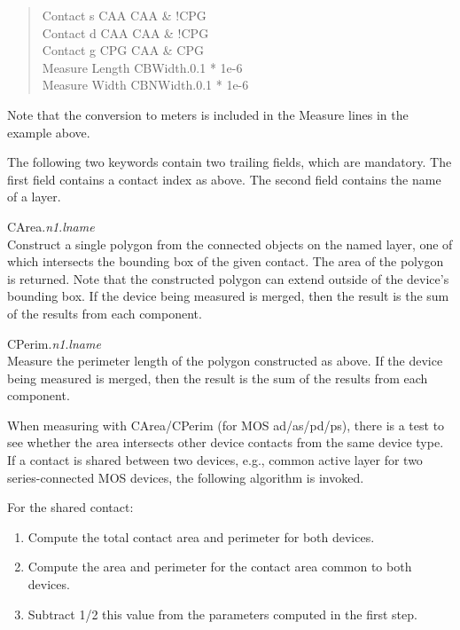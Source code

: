 \begin{description}
\begin{description}
\begin{quote}\rr\vt
Contact s CAA CAA \& !CPG\\
Contact d CAA CAA \& !CPG\\
Contact g CPG CAA \& CPG\\
Measure Length CBWidth.0.1 * 1e-6\\
Measure Width CBNWidth.0.1 * 1e-6\\
\end{quote}

Note that the conversion to meters is included in the {\et Measure}
lines in the example above.

The following two keywords contain two trailing fields, which are
mandatory.  The first field contains a contact index as above.  The
second field contains the name of a layer.

\begin{description}
\item{\et CArea}.{\it n1}.{\it lname}\\
Construct a single polygon from the connected objects on the named
layer, one of which intersects the bounding box of the given contact. 
The area of the polygon is returned.  Note that the constructed
polygon can extend outside of the device's bounding box.  If the
device being measured is merged, then the result is the sum of the
results from each component.

\item{\et CPerim}.{\it n1}.{\it lname}\\
Measure the perimeter length of the polygon constructed as above.  If
the device being measured is merged, then the result is the sum of the
results from each component.
\end{description}

When measuring with CArea/CPerim (for MOS ad/as/pd/ps), there is a
test to see whether the area intersects other device contacts from the
same device type.  If a contact is shared between two devices, e.g.,
common active layer for two series-connected MOS devices, the
following algorithm is invoked.

For the shared contact:
\begin{enumerate}
\item{Compute the total contact area and perimeter for both devices.}
\item{Compute the area and perimeter for the contact area common to
both devices.}
\item{Subtract 1/2 this value from the parameters computed in the
first step.}
\end{enumerate}


\end{description}
\end{description}
